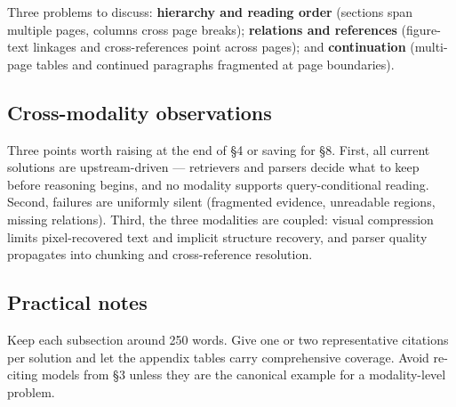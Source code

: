 Three problems to discuss: \textbf{hierarchy and reading order} (sections span multiple pages, columns cross page breaks); \textbf{relations and references} (figure-text linkages and cross-references point across pages); and \textbf{continuation} (multi-page tables and continued paragraphs fragmented at page boundaries).

\subsection*{Cross-modality observations}
Three points worth raising at the end of §4 or saving for §8. First, all current solutions are upstream-driven --- retrievers and parsers decide what to keep before reasoning begins, and no modality supports query-conditional reading. Second, failures are uniformly silent (fragmented evidence, unreadable regions, missing relations). Third, the three modalities are coupled: visual compression limits pixel-recovered text and implicit structure recovery, and parser quality propagates into chunking and cross-reference resolution.

\subsection*{Practical notes}
Keep each subsection around 250 words. Give one or two representative citations per solution and let the appendix tables carry comprehensive coverage. Avoid re-citing models from §3 unless they are the canonical example for a modality-level problem.